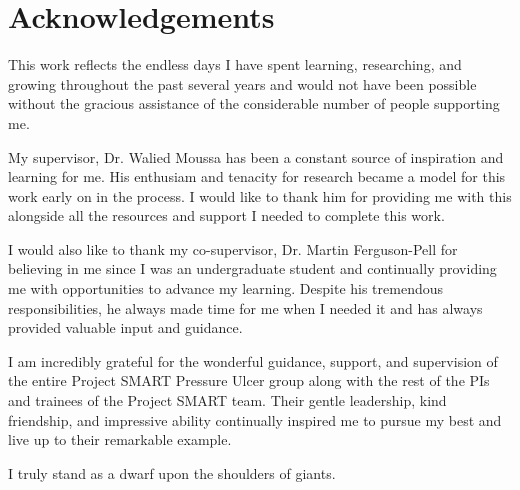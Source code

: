 \onehalfspacing
\chapter*{Acknowledgements}
	This work reflects the endless days I have spent learning, researching, and growing throughout the past several years and would not have been possible without the gracious assistance of the considerable number of people supporting me.

	My supervisor, Dr. Walied Moussa has been a constant source of inspiration and learning for me. His enthusiam and tenacity for research became a model for this work early on in the process. I would like to thank him for providing me with this alongside all the resources and support I needed to complete this work.

	I would also like to thank my co-supervisor, Dr. Martin Ferguson-Pell for believing in me since I was an undergraduate student and continually providing me with opportunities to advance my learning. Despite his tremendous responsibilities, he always made time for me when I needed it and has always provided valuable input and guidance.

	I am incredibly grateful for the wonderful guidance, support, and supervision of the entire Project SMART Pressure Ulcer group along with the rest of the PIs and trainees of the Project SMART team. Their gentle leadership, kind friendship, and impressive ability continually inspired me to pursue my best and live up to their remarkable example.


	I truly stand as a dwarf upon the shoulders of giants.